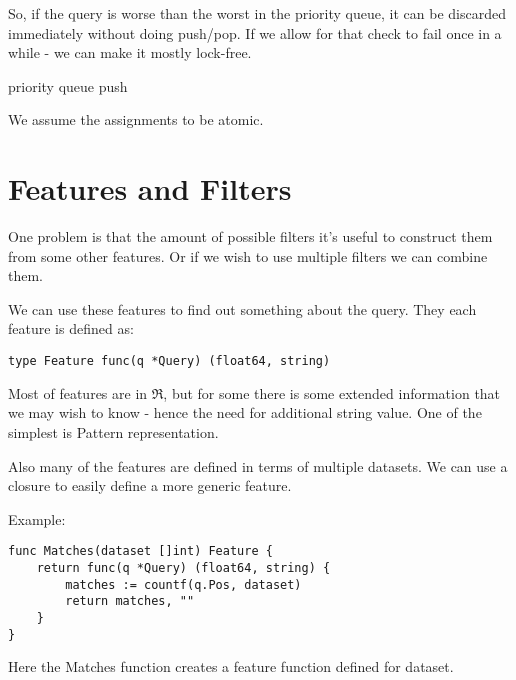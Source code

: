 So, if the query is worse than the worst in the priority queue, it can
be discarded immediately without doing push/pop. If we allow for that check
to fail once in a while - we can make it mostly lock-free.

\begin{algorithm}[H]
    \caption{priority queue push}
\begin{algorithmic}[1]   
        
        \Return
    \EndIf

    \EndIf
\end{algorithmic}
\end{algorithm}

We assume the assignments to be atomic.

\section{Features and Filters}

One problem is that the amount of possible filters it's useful to construct them from some other features. 
Or if we wish to use multiple filters we can combine them.

We can use these features to find out something about the query.
They each feature is defined as:

\begin{verbatim}
type Feature func(q *Query) (float64, string)
\end{verbatim}

Most of features are in $\Re$, but for some there
is some extended information that we may wish to know - hence
the need for additional string value. One of the simplest
is Pattern representation.

Also many of the features are defined in terms of multiple datasets.
We can use a closure to easily define a more generic feature.

Example:

\begin{verbatim}
func Matches(dataset []int) Feature {
    return func(q *Query) (float64, string) {
        matches := countf(q.Pos, dataset)
        return matches, ""
    }
}
\end{verbatim}

Here the Matches function creates a feature function defined
for dataset.

